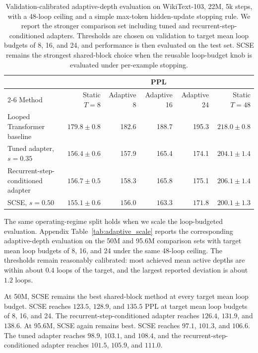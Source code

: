 \documentclass[letterpaper]{article} %
\newcommand{\SCSE}{\textsc{SCSE}}
\theoremstyle{remark}
\begin{document}
\begin{table}[t!]
	\centering
	\scriptsize
	\begin{tabular}{lrrrrr}
		\toprule
		                                   & \multicolumn{5}{c}{PPL}                                                                                   \\
		\cmidrule(lr){2-6}
		Method                             & Static $T=8$            & Adaptive 8       & Adaptive 16      & Adaptive 24      & Static $T=48$          \\
		\midrule
		Looped Transformer baseline        & $179.8\pm0.8$           & 182.6            & 188.7            & 195.3            & $218.0\pm0.8$          \\
		Tuned adapter, $s=0.35$            & $156.4\pm0.6$           & 157.9            & 165.4            & 174.1            & $204.1\pm1.4$          \\
		Recurrent-step-conditioned adapter & $156.7\pm0.5$           & 158.3            & 165.8            & 175.1            & $206.1\pm1.4$          \\
		\SCSE{}, $s=0.50$                  & $\mathbf{155.1\pm0.6}$  & $\mathbf{156.0}$ & $\mathbf{163.3}$ & $\mathbf{171.8}$ & $\mathbf{200.1\pm1.3}$ \\
		\bottomrule
	\end{tabular}
	\caption{Validation-calibrated adaptive-depth evaluation on WikiText-103, 22M, 5k steps, with a 48-loop ceiling and a simple max-token hidden-update stopping rule.  We report the stronger comparison set including tuned and recurrent-step-conditioned adapters.  Thresholds are chosen on validation to target mean loop budgets of 8, 16, and 24, and performance is then evaluated on the test set.  \SCSE{} remains the strongest shared-block choice when the reusable loop-budget knob is evaluated under per-example stopping.}
	\label{tab:adaptive_wt103}
\end{table}

The same operating-regime split holds when we scale the loop-budgeted evaluation.  Appendix Table~\ref{tab:adaptive_scale} reports the corresponding adaptive-depth evaluation on the 50M and 95.6M comparison sets with target mean loop budgets of 8, 16, and 24 under the same 48-loop ceiling.  The thresholds remain reasonably calibrated: most achieved mean active depths are within about $0.4$ loops of the target, and the largest reported deviation is about $1.2$ loops.

At 50M, \SCSE{} remains the best shared-block method at every target mean loop budget.  \SCSE{} reaches $123.5$, $128.9$, and $135.5$ PPL at target mean loop budgets of 8, 16, and 24.  The recurrent-step-conditioned adapter reaches $126.4$, $131.9$, and $138.6$.  At 95.6M, \SCSE{} again remains best.  \SCSE{} reaches $97.1$, $101.3$, and $106.6$.  The tuned adapter reaches $98.9$, $103.1$, and $108.4$, and the recurrent-step-conditioned adapter reaches $101.5$, $105.9$, and $111.0$.
\end{document}
